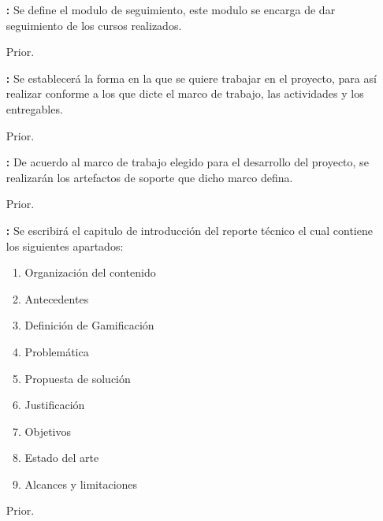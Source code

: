 \begin{multicols}{2}
\begin{itemize}
    	\item[\bf \ida] {\bf \desc:} Se define el modulo de seguimiento, este modulo se encarga de dar seguimiento de los cursos realizados.
        \item[Prior.] \Valor
\end{itemize}

\begin{itemize}
    	\item[\bf \ida] {\bf \desc:} Se establecerá la forma en la que se quiere trabajar en el proyecto, para así realizar conforme a los que dicte el marco de trabajo, las actividades y los entregables.
        \item[Prior.] \Valor
\end{itemize}

\begin{itemize}
    	\item[\bf \ida] {\bf \desc:} De acuerdo al marco de trabajo elegido para el desarrollo del proyecto, se realizarán los artefactos de soporte que dicho marco defina.
        \item[Prior.] \Valor
\end{itemize}

\end{multicols}

\begin{itemize}
    	\item[\bf \ida] {\bf \desc:} Se escribirá el capitulo de introducción del reporte técnico el cual contiene los siguientes apartados:

    	\begin{enumerate}
    	    \item Organización del contenido
    	    \item Antecedentes
    	    \item Definición de Gamificación
    	    \item Problemática
    	    \item Propuesta de solución
    	    \item Justificación
    	    \item Objetivos
    	    \item Estado del arte
    	    \item Alcances y limitaciones
    	\end{enumerate}

        \item[Prior.] \Valor
\end{itemize}

